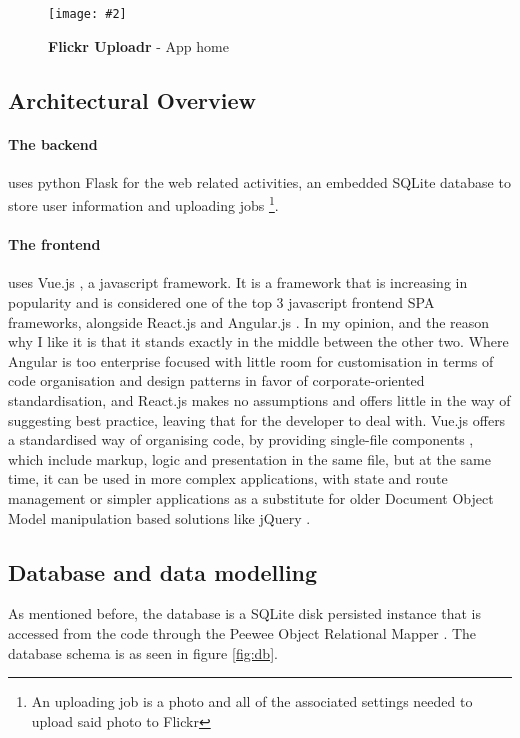 \documentclass[10pt, a4paper]{article}
\newcommand{\figuremacro}[5]{
\begin{figure}[#1]
\centering
\texttt{[image: \#2]}
\caption[#3]{\textbf{#3}#4}
\label{fig:#2}
\end{figure}
}
\begin{document}
        \figuremacro{h}{app}{Flickr Uploadr}{ - App home}{1.0}

        \subsection{Architectural Overview}
        \paragraph{The backend} uses python Flask \cite{Flask} for the web related activities, an embedded SQLite\cite{SQLite} database to store user information and uploading jobs \footnote{\label{ft:uploading_job} An uploading job is a photo and all of the associated settings needed to upload said photo to Flickr}.

        \paragraph{The frontend} uses Vue.js \cite{Vue.js}, a javascript framework. It is a framework that is increasing in popularity and is considered one of the top 3 javascript frontend SPA frameworks, alongside React.js \cite{React.js} and Angular.js \cite{Angular.js}.
        In my opinion, and the reason why I like it is that it stands exactly in the middle between the other two. Where Angular is too enterprise focused with little room for customisation in terms of code organisation and design patterns in favor of corporate-oriented standardisation, and React.js makes no assumptions and offers little in the way of suggesting best practice, leaving that for the developer to deal with.
        Vue.js offers a standardised way of organising code, by providing single-file components \cite{single_file_components}, which include markup, logic and presentation in the same file, but at the same time, it can be used in more complex applications, with state \cite{Vuex} and route \cite{Vue_Router} management or simpler applications as a substitute for older Document Object Model manipulation based solutions like jQuery \cite{jquery_vue}.


        \subsection{Database and data modelling}
        As mentioned before, the database is a SQLite disk persisted instance that is accessed from the code through the Peewee Object Relational Mapper \cite{peewee}. The database schema is as seen in figure \ref{fig:db}. 
\end{document}
